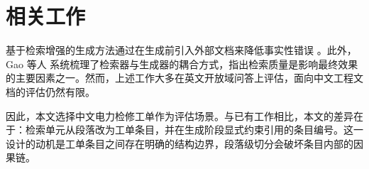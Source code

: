 \section{相关工作}

基于检索增强的生成方法通过在生成前引入外部文档来降低事实性错误 \cite{lewis2020rag}。此外，Gao 等人 \cite{gao2023survey} 系统梳理了检索器与生成器的耦合方式，指出检索质量是影响最终效果的主要因素之一。然而，上述工作大多在英文开放域问答上评估，面向中文工程文档的评估仍然有限。

因此，本文选择中文电力检修工单作为评估场景。与已有工作相比，本文的差异在于：检索单元从段落改为工单条目，并在生成阶段显式约束引用的条目编号。这一设计的动机是工单条目之间存在明确的结构边界，段落级切分会破坏条目内部的因果链。
